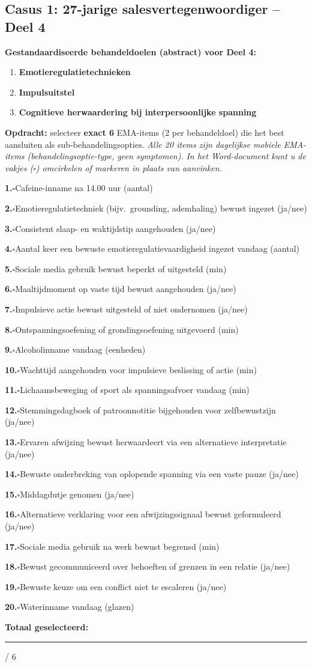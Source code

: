 \documentclass[11pt,a4paper]{article}
\newcommand{\checkitemBFS}[2]{%
\noindent\small\textbf{#1.}\hspace{0.45em}$\square$\hspace{0.4em}#2\par\vspace{0.20em}}
\begin{document}
\newpage
\subsection*{Casus 1: 27-jarige salesvertegenwoordiger -- Deel 4}

\begin{contextbox}
\small\textbf{Gestandaardiseerde behandeldoelen (abstract) voor Deel 4:}
\begin{enumerate}[topsep=2pt,itemsep=1pt,label=\arabic*.]
\item \textbf{Emotieregulatietechnieken}
\item \textbf{Impulsuitstel}
\item \textbf{Cognitieve herwaardering bij interpersoonlijke spanning}
\end{enumerate}
\end{contextbox}

\begin{responsebox}
\small\textbf{Opdracht:} selecteer \textbf{exact 6} EMA-items (2 per behandeldoel) die het best aansluiten als sub-behandelingsopties.
\textit{Alle 20 items zijn dagelijkse mobiele EMA-items (behandelingsoptie-type, geen symptomen).}
\textit{In het Word-document kunt u de vakjes ($\square$) omcirkelen of markeren in plaats van aanvinken.}

\checkitemBFS{1}{Cafeine-inname na 14.00 uur (aantal)}
\checkitemBFS{2}{Emotieregulatietechniek (bijv.\ grounding, ademhaling) bewust ingezet (ja/nee)}
\checkitemBFS{3}{Consistent slaap- en waktijdstip aangehouden (ja/nee)}
\checkitemBFS{4}{Aantal keer een bewuste emotieregulatievaardigheid ingezet vandaag (aantal)}
\checkitemBFS{5}{Sociale media gebruik bewust beperkt of uitgesteld (min)}
\checkitemBFS{6}{Maaltijdmoment op vaste tijd bewust aangehouden (ja/nee)}
\checkitemBFS{7}{Impulsieve actie bewust uitgesteld of niet ondernomen (ja/nee)}
\checkitemBFS{8}{Ontspanningsoefening of grondingsoefening uitgevoerd (min)}
\checkitemBFS{9}{Alcoholinname vandaag (eenheden)}
\checkitemBFS{10}{Wachttijd aangehouden voor impulsieve beslissing of actie (min)}
\checkitemBFS{11}{Lichaamsbeweging of sport als spanningsafvoer vandaag (min)}
\checkitemBFS{12}{Stemmingsdagboek of patroonnotitie bijgehouden voor zelfbewustzijn (ja/nee)}
\checkitemBFS{13}{Ervaren afwijzing bewust herwaardeert via een alternatieve interpretatie (ja/nee)}
\checkitemBFS{14}{Bewuste onderbreking van oplopende spanning via een vaste pauze (ja/nee)}
\checkitemBFS{15}{Middagdutje genomen (ja/nee)}
\checkitemBFS{16}{Alternatieve verklaring voor een afwijzingssignaal bewust geformuleerd (ja/nee)}
\checkitemBFS{17}{Sociale media gebruik na werk bewust begrensd (min)}
\checkitemBFS{18}{Bewust gecommuniceerd over behoeften of grenzen in een relatie (ja/nee)}
\checkitemBFS{19}{Bewuste keuze om een conflict niet te escaleren (ja/nee)}
\checkitemBFS{20}{Waterinname vandaag (glazen)}
\vspace{0.4em}
\noindent\textbf{Totaal geselecteerd:}\hspace{0.5em}\rule{1.2cm}{0.25pt}\hspace{0.2em}/ 6
\end{responsebox}
\end{document}
